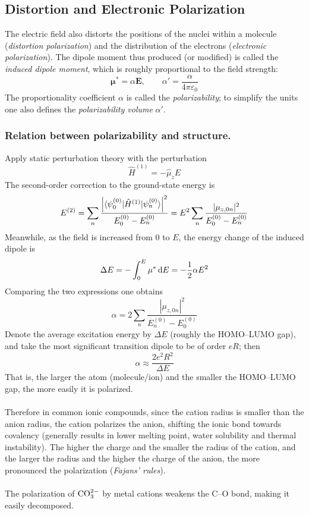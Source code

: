 	\subsection{Distortion and Electronic Polarization}\label{polarization}

		The electric field also distorts the positions of the nuclei within a molecule (\emph{distortion polarization}) and the distribution of the electrons (\emph{electronic polarization}). 
		The dipole moment thus produced (or modified) is called the \emph{induced dipole moment}, which is roughly proportional to the field strength:
		\[\mathbf{\mu}^{*} = \alpha\mathbf{E}, \qquad \alpha' = \frac{\alpha}{4\pi\varepsilon_0}\]
		The proportionality coefficient $\alpha$ is called the \emph{polarizability}; to simplify the units one also defines the \emph{polarizability volume} $\alpha'$.
		\subsubsection{Relation between polarizability and structure.}
		Apply static perturbation theory with the perturbation
		\[\hat{H}^{(1)} = -\hat{\mu}_z E\]
		The second-order correction to the ground-state energy is
		\[E^{(2)} = \sum_{n}\frac{\left|\braket{\psi_0^{(0)}|\hat{H}^{(1)}|\psi_n^{(0)}}\right|^{2}}{E_0^{(0)}-E_n^{(0)}}
		= E^{2}\sum_{n}\frac{|\mu_{z,0n}|^{2}}{E_0^{(0)}-E_n^{(0)}}\]
		Meanwhile, as the field is increased from $0$ to $E$, the energy change of the induced dipole is
		\[\Delta E = -\int_{0}^{E}\mu^{*}\,\text{d} E = -\frac{1}{2}\alpha E^{2}\]
		Comparing the two expressions one obtains
		\[\boxed{\alpha = 2\sum_{n}\frac{|\mu_{z,0n}|^{2}}{E_n^{(0)}-E_0^{(0)}}}\]
		Denote the average excitation energy by $\Delta E$ (roughly the HOMO--LUMO gap), and take the most significant transition dipole to be of order $eR$; then
		\[\alpha \approx \frac{2e^{2}R^{2}}{\Delta E}\]
		That is, the larger the atom (molecule/ion) and the smaller the HOMO--LUMO gap, the more easily it is polarized. \\\ \\
		Therefore in common ionic compounds, since the cation radius is smaller than the anion radius, the cation polarizes the anion, shifting the ionic bond towards covalency (generally results in lower melting point, water solubility and thermal instability). 
		The higher the charge and the smaller the radius of the cation, and the larger the radius and the higher the charge of the anion, the more pronounced the polarization (\emph{Fajans' rules}). \\ \\
		The polarization of $\rm CO_3^{2-}$ by metal cations weakens the C--O bond, making it easily decomposed.

